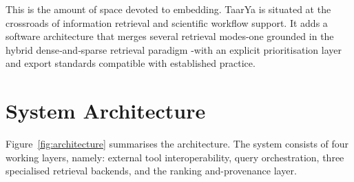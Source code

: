 \documentclass[preprint,12pt,authoryear]{elsarticle}
\begin{document}
This is the amount of space devoted to embedding. \textsf{TaarYa} is situated at the crossroads of information retrieval and scientific workflow support. It adds a software architecture that merges several retrieval modes-one grounded in the hybrid dense‑and‑sparse retrieval paradigm \citep{Karpukhin2020}-with an explicit prioritisation layer and export standards compatible with established practice.

\section{System Architecture}
\label{sec:architecture}

Figure~\ref{fig:architecture} summarises the architecture. The system consists of four working layers, namely: external tool interoperability, query orchestration, three specialised retrieval backends, and the ranking and-provenance layer.
\end{document}
